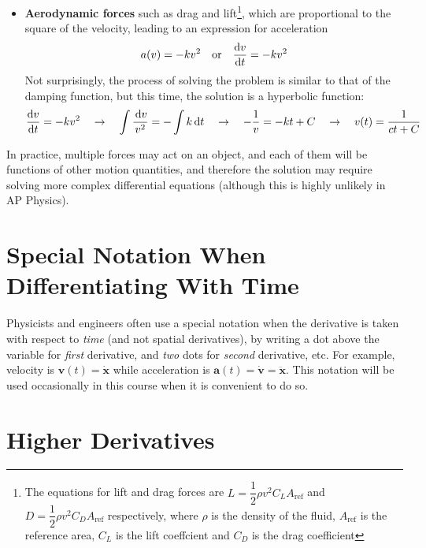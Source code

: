 \documentclass{../../oss-handout}
\begin{document}
\begin{itemize}[leftmargin=15pt]
\item\textbf{Aerodynamic forces} such as drag and lift\footnote{The equations
  for lift and drag forces are $L=\dfrac12\rho v^2C_LA_\text{ref}$ and
  $D=\dfrac12\rho v^2C_DA_\text{ref}$ respectively, where $\rho$ is the density
  of the fluid, $A_\text{ref}$ is the reference area, $C_L$ is the lift
  coeffcient and $C_D$ is the drag coefficient}, which are proportional
  to the square of the velocity, leading to an expression for acceleration 
  \begin{equation*}
    a(v)=-kv^2\quad\text{or}\quad \diff vt=-kv^2
  \end{equation*}
  Not surprisingly, the process of solving the problem is similar to that of
  the damping function, but this time, the solution is a hyperbolic function:
  \begin{equation*}
    \diff vt=-kv^2\quad\rightarrow\quad \int\frac{\dl v}{v^2}=-\int k\dl t
    \quad\rightarrow\quad -\frac1v=-kt+C
    \quad\rightarrow\quad v(t)=\frac{1}{ct+C}
  \end{equation*}
\end{itemize}
In practice, multiple forces may act on an object, and each of them will be
functions of other motion quantities, and therefore the solution may require
solving more complex differential equations (although this is highly unlikely in
AP Physics).

\section{Special Notation When Differentiating With Time}

Physicists and engineers often use a special notation when the derivative is
taken with respect to \emph{time} (and not spatial derivatives), by writing a
dot above the variable for \emph{first} derivative, and \emph{two} dots for
\emph{second} derivative, etc. For example, velocity is
$\bm v(t)=\dot{\bm x}$ while acceleration is
$\bm a(t)= \dot{\bm v}=\ddot{\bm x}$. This notation will be used occasionally
in this course when it is convenient to do so.


\section{Higher Derivatives}
\end{document}
